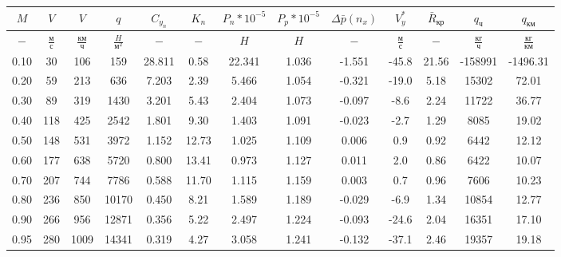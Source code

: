 \begin{tabular}{|c|c|c|c|c|c|c|c|c|c|c|c|c|}
\hline
$M$ & $V$ & $V$ & $q$ & $C_{y_n}$ & $K_n$ & $P_n*10^{-5}$ & $P_p*10^{-5}$ & $\Delta \bar{p}(n_x)$ & $V_y^*$ & $\bar{R}_{кр}$ & $q_{ч}$ & $q_{км}$ \\ 
\hline
$-$ & $\frac{м}{с}$ & $\frac{км}{ч}$ & $\frac{H}{м^2}$ & $-$ & $-$ & $H$ & $H$ & $-$ & $\frac{м}{с}$ & $-$ & $\frac{кг}{ч}$ & $\frac{кг}{км}$ \\ 
\hline
0.10 & 30 & 106 & 159 & 28.811 & 0.58 & 22.341 & 1.036 & -1.551 & -45.8 & 21.56 & -158991 & -1496.31 \\ 
\hline
0.20 & 59 & 213 & 636 & 7.203 & 2.39 & 5.466 & 1.054 & -0.321 & -19.0 & 5.18 & 15302 & 72.01 \\ 
\hline
0.30 & 89 & 319 & 1430 & 3.201 & 5.43 & 2.404 & 1.073 & -0.097 & -8.6 & 2.24 & 11722 & 36.77 \\ 
\hline
0.40 & 118 & 425 & 2542 & 1.801 & 9.30 & 1.403 & 1.091 & -0.023 & -2.7 & 1.29 & 8085 & 19.02 \\ 
\hline
0.50 & 148 & 531 & 3972 & 1.152 & 12.73 & 1.025 & 1.109 & 0.006 & 0.9 & 0.92 & 6442 & 12.12 \\ 
\hline
0.60 & 177 & 638 & 5720 & 0.800 & 13.41 & 0.973 & 1.127 & 0.011 & 2.0 & 0.86 & 6422 & 10.07 \\ 
\hline
0.70 & 207 & 744 & 7786 & 0.588 & 11.70 & 1.115 & 1.159 & 0.003 & 0.7 & 0.96 & 7606 & 10.23 \\ 
\hline
0.80 & 236 & 850 & 10170 & 0.450 & 8.21 & 1.589 & 1.189 & -0.029 & -6.9 & 1.34 & 10854 & 12.77 \\ 
\hline
0.90 & 266 & 956 & 12871 & 0.356 & 5.22 & 2.497 & 1.224 & -0.093 & -24.6 & 2.04 & 16351 & 17.10 \\ 
\hline
0.95 & 280 & 1009 & 14341 & 0.319 & 4.27 & 3.058 & 1.241 & -0.132 & -37.1 & 2.46 & 19357 & 19.18 \\ 
\hline
\end{tabular}